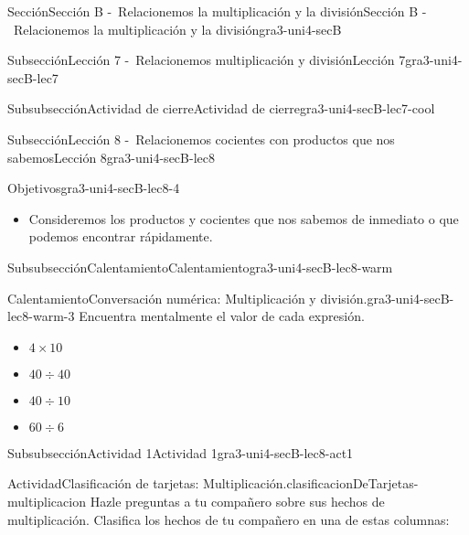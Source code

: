 \documentclass[twoside,14pt,]{extarticle}
\begin{document}
\begin{sectionptx}{Sección}{Sección B -~Relacionemos la multiplicación y la división}{}{Sección B -~Relacionemos la multiplicación y la división}{}{}{gra3-uni4-secB}
\begin{subsectionptx}{Subsección}{Lección 7 -~Relacionemos multiplicación y división}{}{Lección 7}{}{}{gra3-uni4-secB-lec7}
\begin{subsubsectionptx}{Subsubsección}{Actividad de cierre}{}{Actividad de cierre}{}{}{gra3-uni4-secB-lec7-cool}
\end{subsubsectionptx}
\end{subsectionptx}
%
%
\typeout{************************************************}
\typeout{************************************************}
%
\begin{subsectionptx}{Subsección}{Lección 8 -~Relacionemos cocientes con productos que nos sabemos}{}{Lección 8}{}{}{gra3-uni4-secB-lec8}
\begin{objectives}{Objetivos}{gra3-uni4-secB-lec8-4}
%
\begin{itemize}[label=\textbullet]
\item{}Consideremos los productos y cocientes que nos sabemos de inmediato o que podemos encontrar rápidamente.%
\end{itemize}
\end{objectives}
%
%
\typeout{************************************************}
\typeout{************************************************}
%
\begin{subsubsectionptx}{Subsubsección}{Calentamiento}{}{Calentamiento}{}{}{gra3-uni4-secB-lec8-warm}
\begin{exploration}{Calentamiento}{Conversación numérica: Multiplicación y división.}{gra3-uni4-secB-lec8-warm-3}%
Encuentra mentalmente el valor de cada expresión.%
%
\begin{itemize}[label=\textbullet]
\item{}\(\displaystyle 4\times 10\)%
\item{}\(\displaystyle 40\div 40\)%
\item{}\(\displaystyle 40\div 10\)%
\item{}\(\displaystyle 60\div 6\)%
\end{itemize}
\end{exploration}%
\end{subsubsectionptx}
%
%
\typeout{************************************************}
\typeout{************************************************}
%
\begin{subsubsectionptx}{Subsubsección}{Actividad 1}{}{Actividad 1}{}{}{gra3-uni4-secB-lec8-act1}
\begin{activity}{Actividad}{Clasificación de tarjetas: Multiplicación.}{clasificacionDeTarjetas-multiplicacion}%
Hazle preguntas a tu compañero sobre sus hechos de multiplicación. Clasifica los hechos de tu compañero en una de estas columnas:%
%
\begin{enumerate}

\end{enumerate}
\end{activity}
\end{subsubsectionptx}
\end{subsectionptx}
\end{sectionptx}
\end{document}
